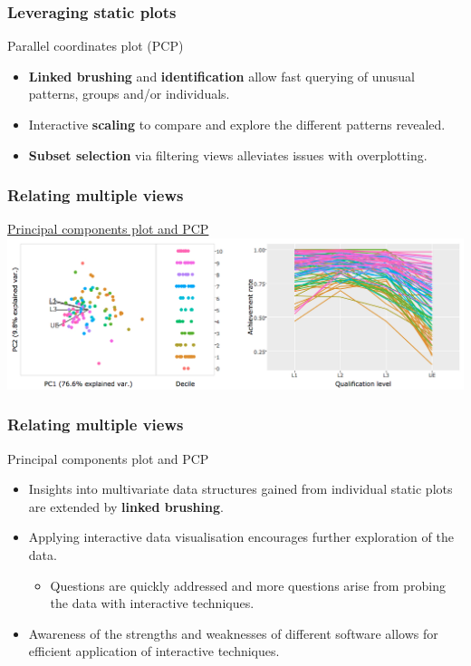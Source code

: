 \documentclass{beamer}
\begin{document}
	\begin{frame}
	\frametitle{Leveraging static plots}
	Parallel coordinates plot (PCP)
	\begin{itemize}
		\item \textbf{Linked brushing} and \textbf{identification} allow fast querying of unusual patterns, groups and/or individuals.
		\item Interactive \textbf{scaling} to compare and explore the different patterns revealed.
		\item \textbf{Subset selection} via filtering views alleviates issues with overplotting.
	\end{itemize}
	\end{frame}

	\begin{frame}
		\frametitle{Relating multiple views}
		\href{run:./multiple.html}{Principal components plot and PCP}
		\includegraphics[scale=0.3]{files/PCApcp.jpeg}
	\end{frame}

	\begin{frame}
		\frametitle{Relating multiple views}
		Principal components plot and PCP
		\begin{itemize}
			\item Insights into multivariate data structures gained from individual static plots are extended by \textbf{linked brushing}.
			\item Applying interactive data visualisation encourages further exploration of the data.
			\begin{itemize}
				\item Questions are quickly addressed and more questions arise from probing the data with interactive techniques.
			\end{itemize}
			\item Awareness of the strengths and weaknesses of different software allows for efficient application of interactive techniques.
		\end{itemize}
	\end{frame}
\end{document}
